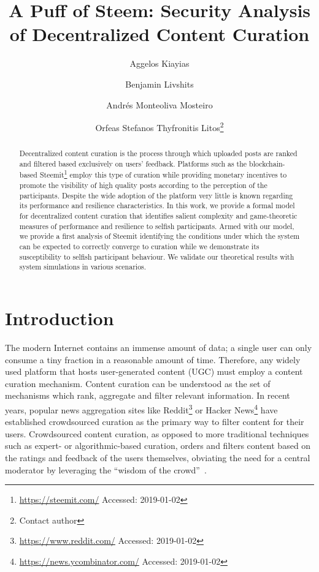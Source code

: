 \documentclass[a4paper,english,cleveref, autoref]{oasics-v2019}
\title{A Puff of Steem: Security Analysis of Decentralized Content Curation}
\author{Aggelos Kiayias}{University of Edinburgh, United Kingdom \and IOHK, Hong
Kong}{}{}{}
\author{Benjamin Livshits}{Imperial College of London, United Kingdom \and Brave
Software, United Kingdom}{}{}{}
\author{Andr\'es Monteoliva Mosteiro}{University of Edinburgh, United Kingdom
\and Clearmatics, United Kingdom}{}{}{}
\author{Orfeas Stefanos Thyfronitis Litos\footnote{Contact author}}{University
of Edinburgh, United Kingdom}{o.thyfronitis@ed.ac.uk}{}{}
\begin{document}
\maketitle

\begin{abstract}
  Decentralized content curation is the process through which uploaded posts are
  ranked and filtered based exclusively on users' feedback. Platforms such as
  the blockchain-based Steemit\footnote{\url{https://steemit.com/} Accessed:
  2019-01-02} employ this type of curation while providing monetary incentives
  to promote the visibility of high quality posts according to the perception of
  the participants. Despite the wide adoption of the platform very little is
  known regarding its performance and resilience characteristics. In this work,
  we provide a formal model for decentralized content curation that identifies
  salient complexity and game-theoretic measures of performance and resilience
  to selfish participants. Armed with our model, we provide a first analysis of
  Steemit identifying the conditions under which the system can be expected to
  correctly converge to curation while we demonstrate its susceptibility to
  selfish participant behaviour. We validate our theoretical results with system
  simulations in various scenarios.
\end{abstract}

\section{Introduction}
  The modern Internet contains an immense amount of data; a single user can only
  consume a tiny fraction in a reasonable amount of time. Therefore, any widely
  used platform that hosts user-generated content (UGC) must employ a content
  curation mechanism. Content curation can be understood as the set of
  mechanisms which rank, aggregate and filter relevant information. In recent
  years, popular news aggregation sites like
  Reddit\footnote{\url{https://www.reddit.com/} Accessed: 2019-01-02} or Hacker
  News\footnote{\url{https://news.ycombinator.com/} Accessed: 2019-01-02} have
  established crowdsourced curation as the primary way to filter content for
  their users. Crowdsourced content curation, as opposed to more traditional
  techniques such as expert- or algorithmic-based curation, orders and filters
  content based on the ratings and feedback of the users themselves, obviating
  the need for a central moderator by leveraging the ``wisdom of the
  crowd''~\cite{askalidis2013theoretical,zhu2010measurement}.
\end{document}
